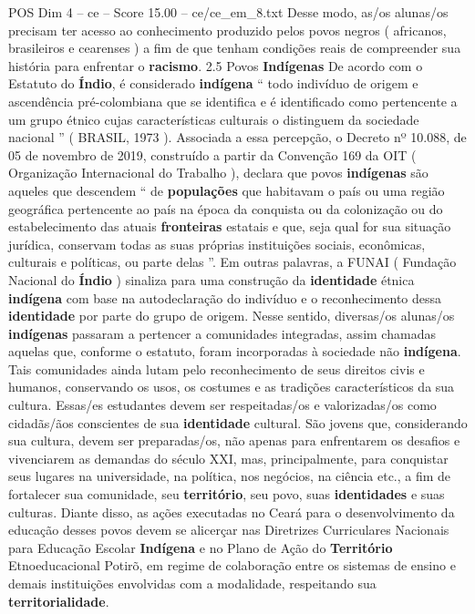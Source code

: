 \begin{textsample}{POS Dim 4 – ce – Score 15.00 – ce/ce\_em\_8.txt}
Desse modo, as/os alunas/os precisam ter acesso ao conhecimento produzido pelos povos negros ( africanos, brasileiros e cearenses ) a fim de que tenham condições reais de compreender sua história para enfrentar o \textbf{racismo}. 2.5 Povos \textbf{Indígenas} De acordo com o Estatuto do \textbf{Índio}, é considerado \textbf{indígena} “ todo indivíduo de origem e ascendência pré-colombiana que se identifica e é identificado como pertencente a um grupo étnico cujas características culturais o distinguem da sociedade nacional ” ( BRASIL, 1973 ).
Associada a essa percepção, o Decreto nº 10.088, de 05 de novembro de 2019, construído a partir da Convenção 169 da OIT ( Organização Internacional do Trabalho ), declara que povos \textbf{indígenas} são aqueles que descendem “ de \textbf{populações} que habitavam o país ou uma região geográfica pertencente ao país na época da conquista ou da colonização ou do estabelecimento das atuais \textbf{fronteiras} estatais e que, seja qual for sua situação jurídica, conservam todas as suas próprias instituições sociais, econômicas, culturais e políticas, ou parte delas ”.
Em outras palavras, a FUNAI ( Fundação Nacional do \textbf{Índio} ) sinaliza para uma construção da \textbf{identidade} étnica \textbf{indígena} com base na autodeclaração do indivíduo e o reconhecimento dessa \textbf{identidade} por parte do grupo de origem.
Nesse sentido, diversas/os alunas/os \textbf{indígenas} passaram a pertencer a comunidades integradas, assim chamadas aquelas que, conforme o estatuto, foram incorporadas à sociedade não \textbf{indígena}.
Tais comunidades ainda lutam pelo reconhecimento de seus direitos civis e humanos, conservando os usos, os costumes e as tradições característicos da sua cultura.
Essas/es estudantes devem ser respeitadas/os e valorizadas/os como cidadãs/ãos conscientes de sua \textbf{identidade} cultural.
São jovens que, considerando sua cultura, devem ser preparadas/os, não apenas para enfrentarem os desafios e vivenciarem as demandas do século XXI, mas, principalmente, para conquistar seus lugares na universidade, na política, nos negócios, na ciência etc., a fim de fortalecer sua comunidade, seu \textbf{território}, seu povo, suas \textbf{identidades} e suas culturas.
Diante disso, as ações executadas no Ceará para o desenvolvimento da educação desses povos devem se alicerçar nas Diretrizes Curriculares Nacionais para Educação Escolar \textbf{Indígena} e no Plano de Ação do \textbf{Território} Etnoeducacional Potirõ, em regime de colaboração entre os sistemas de ensino e demais instituições envolvidas com a modalidade, respeitando sua \textbf{territorialidade}.

\end{textsample}
